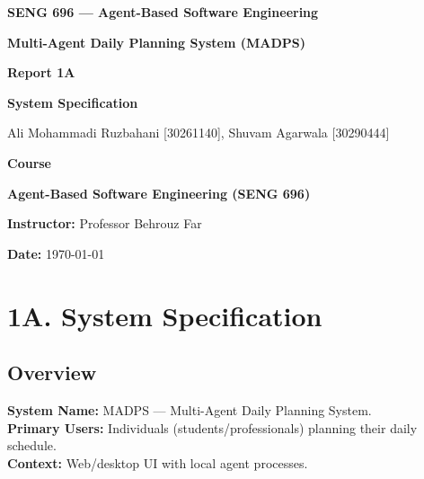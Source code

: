 \documentclass[12pt,oneside]{report}
\begin{document}
\begin{titlepage}
  \centering
  {\Large \textbf{SENG 696 — Agent-Based Software Engineering}\par}
  \vspace{1.5cm}
  {\huge \textbf{Multi-Agent Daily Planning System (MADPS)}\par}
  \vspace{1.3cm}
  {\Large \textbf{Report 1A}\par}
  {\Large \textbf{System Specification}\par}
  \vspace{1.2cm}
  {\large Ali Mohammadi Ruzbahani [30261140], Shuvam Agarwala [30290444]\par}
  \vspace{1.2cm}
  {\large \textbf{Course} \par}
  {\large \textbf{Agent-Based Software Engineering (SENG 696)} \par}
  \vspace{1.2cm}
  {\large \textbf{Instructor:} Professor Behrouz Far\par}
   \vspace{2.2cm}

  {\large \textbf{Date:} \today\par}
  \vfill

\end{titlepage}

\tableofcontents
\onehalfspacing
\clearpage

\chapter*{1A. System Specification}

\section{Overview}
\textbf{System Name:} MADPS — Multi-Agent Daily Planning System.\\
\textbf{Primary Users:} Individuals (students/professionals) planning their daily schedule.\\
\textbf{Context:} Web/desktop UI with local agent processes.
\end{document}
